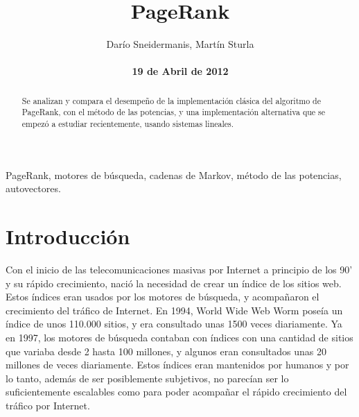 \documentclass[%
    final,
    notitlepage,
    narroweqnarray,
    inline,
    twoside,
    invited
    ]{ieee}
\begin{document}
\title[PageRank]{%
       PageRank}

\author[Sneidermanis, Sturla]{Darío Sneidermanis, Martín Sturla\\
\\\textbf{19 de Abril de 2012}
}



\lognumber{}
\pubitemident{}


\maketitle

\begin{abstract}
Se analizan y compara el desempeño de la implementación clásica del algoritmo de PageRank, con el método de las potencias, y una implementación
alternativa que se empezó a estudiar recientemente, usando sistemas lineales.
\end{abstract}

\begin{keywords}
PageRank, motores de búsqueda, cadenas de Markov, método de las potencias, autovectores.
\end{keywords}

\section{Introducción}
Con el inicio de las telecomunicaciones masivas por Internet a principio de los 90' y su rápido crecimiento, nació la necesidad de
crear un índice de los sitios web. Estos índices eran usados por los motores de búsqueda, y acompañaron el crecimiento del tráfico
de Internet. En 1994, World Wide Web Worm poseía un índice de unos 110.000 sitios, y era consultado unas 1500 veces diariamente. Ya en
1997, los motores de búsqueda contaban con índices con una cantidad de sitios que variaba desde 2 hasta 100 millones, y algunos eran consultados
unas 20 millones de veces diariamente. Estos índices eran mantenidos por humanos y por lo tanto, además de ser posiblemente subjetivos,
no parecían ser lo suficientemente escalables como para poder acompañar el rápido crecimiento del tráfico por Internet. \\
\end{document}
